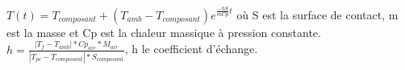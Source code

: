 \documentclass{article}
\begin{document}
$T(t) = T_{composant} + (T_{amb} - T_{composant})e^{\frac{-hS}{mCp}t}$
o\`u S est la surface de contact, m est la masse et Cp est la chaleur massique \`a pression constante. $h =  \frac{|T_{f} - T_{amb}|  * Cp_{air} * M_{air}}{|T_{pc}-T_{composant}|*S_{composant}} $, h le coefficient d'\'echange.
\end{document}
